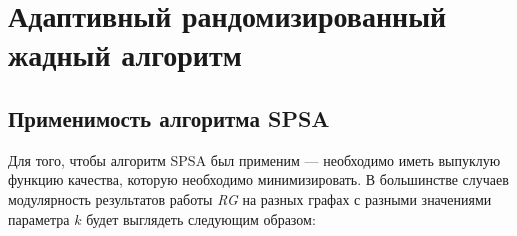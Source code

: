 
\section{Адаптивный рандомизированный жадный алгоритм}
\label{sec:ARG}



\subsection{Применимость алгоритма SPSA}

Для того, чтобы алгоритм SPSA был применим --- необходимо иметь выпуклую функцию качества, которую необходимо минимизировать. В большинстве случаев модулярность результатов работы \emph{RG} на разных графах с разными значениями параметра $k$ будет выглядеть следующим образом:

